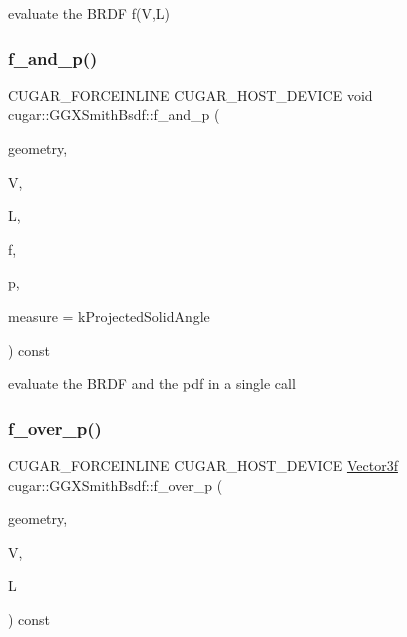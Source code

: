 evaluate the B\+R\+DF f(\+V,\+L) \mbox{\label{structcugar_1_1_g_g_x_smith_bsdf_a06f2287bfdfab8389a9cfb3234991001}} 
\subsubsection{\texorpdfstring{f\+\_\+and\+\_\+p()}{f\_and\_p()}}
{\footnotesize\ttfamily C\+U\+G\+A\+R\+\_\+\+F\+O\+R\+C\+E\+I\+N\+L\+I\+NE C\+U\+G\+A\+R\+\_\+\+H\+O\+S\+T\+\_\+\+D\+E\+V\+I\+CE void cugar\+::\+G\+G\+X\+Smith\+Bsdf\+::f\+\_\+and\+\_\+p (\begin{DoxyParamCaption}\item[{const \hyperlink{structcugar_1_1_differential_geometry}{Differential\+Geometry} \&}]{geometry,  }\item[{const \hyperlink{structcugar_1_1_vector}{Vector3f}}]{V,  }\item[{const \hyperlink{structcugar_1_1_vector}{Vector3f}}]{L,  }\item[{\hyperlink{structcugar_1_1_vector}{Vector3f} \&}]{f,  }\item[{float \&}]{p,  }\item[{const Spherical\+Measure}]{measure = {\ttfamily kProjectedSolidAngle} }\end{DoxyParamCaption}) const\hspace{0.3cm}{\ttfamily [inline]}}

evaluate the B\+R\+DF and the pdf in a single call \mbox{\label{structcugar_1_1_g_g_x_smith_bsdf_a3d429e534144823f363af47932e40d58}} 
\subsubsection{\texorpdfstring{f\+\_\+over\+\_\+p()}{f\_over\_p()}}
{\footnotesize\ttfamily C\+U\+G\+A\+R\+\_\+\+F\+O\+R\+C\+E\+I\+N\+L\+I\+NE C\+U\+G\+A\+R\+\_\+\+H\+O\+S\+T\+\_\+\+D\+E\+V\+I\+CE \hyperlink{structcugar_1_1_vector}{Vector3f} cugar\+::\+G\+G\+X\+Smith\+Bsdf\+::f\+\_\+over\+\_\+p (\begin{DoxyParamCaption}\item[{const \hyperlink{structcugar_1_1_differential_geometry}{Differential\+Geometry} \&}]{geometry,  }\item[{const \hyperlink{structcugar_1_1_vector}{Vector3f}}]{V,  }\item[{const \hyperlink{structcugar_1_1_vector}{Vector3f}}]{L }\end{DoxyParamCaption}) const\hspace{0.3cm}{\ttfamily [inline]}}

